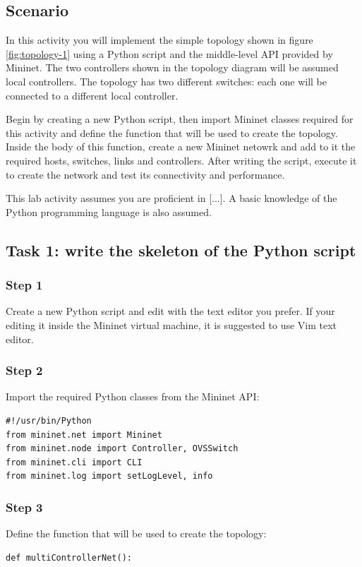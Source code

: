 \subsection*{Scenario}
In this activity you will implement the simple topology shown in figure \ref{fig:topology-1} using
a Python script and the middle-level API provided by Mininet. The two controllers
shown in the topology diagram will be assumed local controllers.
The topology has two different switches: each one will be connected to a different
local controller.

Begin by creating a new Python script, then import Mininet classes required for
this activity and define the function that will be used to create the topology.
Inside the body of this function, create a new Mininet netowrk and add to it the
required hosts, switches, links and controllers. After writing the script, execute
it to create the network and test its connectivity and performance.

This lab activity assumes you are proficient in [...]. A basic knowledge of the
Python programming language is also assumed.





\subsection*{Task 1: write the skeleton of the Python script}
\subsubsection*{Step 1}
Create a new Python script and edit with the text editor you prefer. If your editing
it inside the Mininet virtual machine, it is suggested to use Vim text editor.

\subsubsection*{Step 2}
Import the required Python classes from the Mininet API:
\begin{lstlisting}
#!/usr/bin/Python
from mininet.net import Mininet
from mininet.node import Controller, OVSSwitch
from mininet.cli import CLI
from mininet.log import setLogLevel, info
\end{lstlisting}

\subsubsection*{Step 3}
Define the function that will be used to create the topology:
\begin{lstlisting}
def multiControllerNet():
\end{lstlisting}


